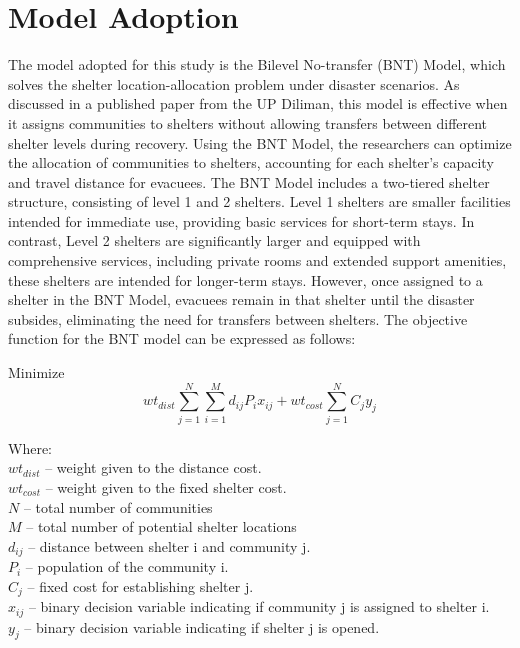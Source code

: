 \section{Model Adoption}
	The model adopted for this study is the Bilevel No-transfer (BNT) Model, which solves the shelter location-allocation problem under disaster scenarios. As discussed in a published paper from the UP Diliman, this model is effective when it assigns communities to shelters without allowing transfers between different shelter levels during recovery. Using the BNT Model, the researchers can optimize the allocation of communities to shelters, accounting for each shelter’s capacity and travel distance for evacuees.
	The BNT Model includes a two-tiered shelter structure, consisting of level 1 and 2 shelters. Level 1 shelters are smaller facilities intended for immediate use, providing basic services for short-term stays. In contrast, Level 2 shelters are significantly larger and equipped with comprehensive services, including private rooms and extended support amenities, these shelters are intended for longer-term stays. However, once assigned to a shelter in the BNT Model, evacuees remain in that shelter until the disaster subsides, eliminating the need for transfers between shelters.
	The objective function for the BNT model can be expressed as follows:
	
	Minimize \begin{equation} wt_{dist}\sum_{j=1}^{N}\sum_{i=1}^{M}d_{ij}P_{i}x_{ij}+wt_{cost}\sum_{j=1}^{N}C_{j}y_{j} \end{equation}
	
	Where:
	\\$wt_{dist}$ – weight given to the distance cost.
	\\$wt_{cost}$ – weight given to the fixed shelter cost.
	\\$N$ – total number of communities
	\\$M$ – total number of potential shelter locations
	\\$d_{ij}$ – distance between shelter i and community j.
	\\$P_{i}$ – population of the community i.
	\\$C_{j}$ – fixed cost for establishing shelter j.
	\\$x_{ij}$ – binary decision variable indicating if community j is assigned to shelter i.
	\\$y_{j}$ – binary decision variable indicating if shelter j is opened.
	\\
	

